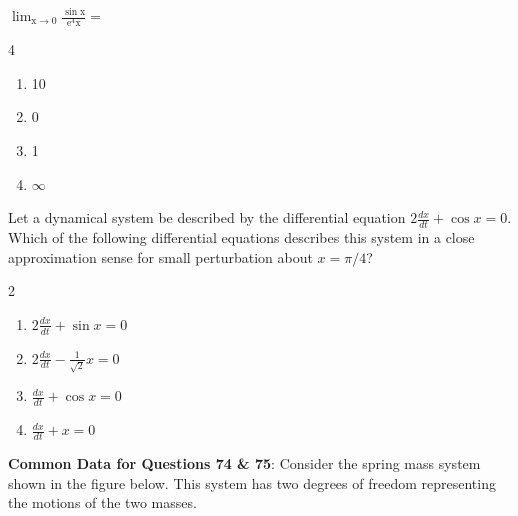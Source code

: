     \item $\mathrm{\lim_{x \to 0} \frac{\sin x}{e^4 x} =}$
    \begin{multicols}{4}
    \begin{enumerate}
        \item 10
        \item 0
        \item 1
        \item $\infty$
    \end{enumerate}
    \end{multicols}
    \item Let a dynamical system be described by the differential equation $2 \frac{dx}{dt} + \cos x = 0$. Which of the following differential equations describes this system in a close approximation sense for small perturbation about $x = \pi/4$?
    \begin{multicols}{2}
    \begin{enumerate}
        \item $2 \frac{dx}{dt} + \sin x = 0$
        \item $2 \frac{dx}{dt} - \frac{1}{\sqrt{2}} x = 0$
        \item $\frac{dx}{dt} + \cos x = 0$
        \item $\frac{dx}{dt} + x = 0$
    \end{enumerate}
    \end{multicols}
\textbf{Common Data for Questions 74 \& 75}: Consider the spring mass system shown in the figure below. This system has two degrees of freedom representing the motions of the two masses.

\begin{figure}[H]
    \centering
    
    \caption{}
    \label{fig:q74 75}
\end{figure}

